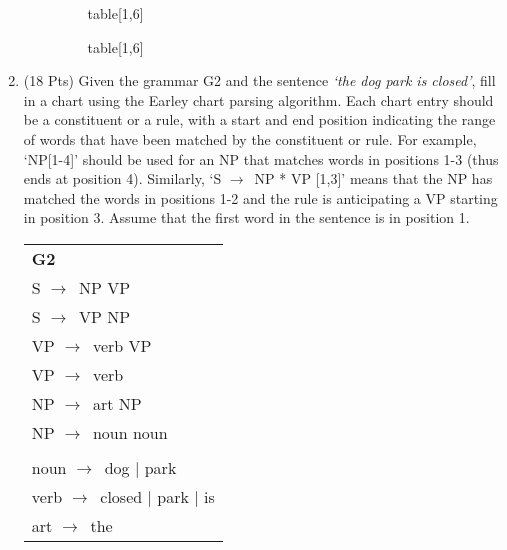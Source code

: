 \documentclass[11pt]{article}
\newcommand{\ra}{$\rightarrow$~}
\begin{document}
\begin{enumerate}
\begin{enumerate}
\begin{figure}[h]
\begin{minipage}[b]{0.5\linewidth}
\centering
{}
\caption{table[1,6]}
\end{minipage}
\begin{minipage}[b]{0.5\linewidth}
\centering
{}
\caption{table[1,6]}
\end{minipage}
\end{figure}

\vspace{3in}


\end{enumerate}


\newpage

\item (18 Pts) Given the grammar G2 and the sentence {\it `the dog park is
  closed'}, fill in a chart using the Earley chart parsing
  algorithm. Each chart entry should be a constituent or a rule, with
  a start and end position indicating the range of words that have
  been matched by the constituent or rule. For example, `NP[1-4]'
  should be used for an NP that matches words in positions 1-3 (thus ends at
  position 4). Similarly, `S \ra NP * VP
  [1,3]' means that the NP has matched the words in positions
  1-2 and the rule is  anticipating a VP starting in position
  3. Assume that the first word in the   sentence is in position 1.

\begin{center}
\begin{tabular}{|l|} \hline 
\textbf{G2}  \\  
S \ra NP VP    \\
S \ra VP NP     \\
VP \ra verb VP     \\
VP \ra verb \\
NP \ra art NP    \\
NP \ra noun noun \\  \\
noun \ra dog $\mid$ park \\
verb \ra closed $\mid$ park $\mid$ is \\
art \ra the \\
\hline
\end{tabular}\end{center}


\end{enumerate}
\end{document}

